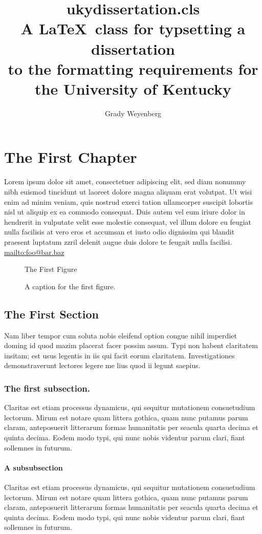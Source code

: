 \documentclass[endorse]{ukydissertation}
\title{ukydissertation.cls\protect\\%
  A \LaTeX\ class for typsetting a dissertation\protect\\%
  to the formatting requirements for\protect\\%
  the University of Kentucky%
}
\author{Grady Weyenberg}
\begin{document}
\makefrontmatter

\chapter{The First Chapter}
\label{cha:first-chapter}
Lorem ipsum dolor sit amet, consectetuer adipiscing elit, sed diam
nonummy nibh euismod tincidunt ut laoreet dolore magna aliquam erat
volutpat.\cite{lamport94} Ut wisi enim ad minim veniam, quis nostrud exerci tation
ullamcorper suscipit lobortis nisl ut aliquip ex ea commodo
consequat. Duis autem vel eum iriure dolor in hendrerit in vulputate
velit esse molestie consequat, vel illum dolore eu feugiat nulla
facilisis at vero eros et accumsan et iusto odio dignissim qui blandit
praesent luptatum zzril delenit augue duis dolore te feugait nulla
facilisi. \url{mailto:foo@bar.baz}
\begin{figure}
  \centering
  The First Figure
  \caption[A name for the ToC]{A caption for the first figure.}
  \label{fig:numberone}
\end{figure}
\section{The First Section}
\label{sec:first-section}

Nam liber tempor cum soluta nobis eleifend option congue
nihil imperdiet doming id quod mazim placerat facer possim assum. Typi
non habent claritatem insitam; est usus legentis in iis qui facit
eorum claritatem. Investigationes demonstraverunt lectores legere me
lius quod ii legunt saepius.
\subsection{The first subsection.}
\label{sec:first-subsection}

Claritas est etiam processus dynamicus,
qui sequitur mutationem consuetudium lectorum. Mirum est notare quam
littera gothica, quam nunc putamus parum claram, anteposuerit
litterarum formas humanitatis per seacula quarta decima et quinta
decima. Eodem modo typi, qui nunc nobis videntur parum clari, fiant
sollemnes in futurum.

\subsubsection{A subsubsection}

Claritas est etiam processus dynamicus,
qui sequitur mutationem consuetudium lectorum. Mirum est notare quam
littera gothica, quam nunc putamus parum claram, anteposuerit
litterarum formas humanitatis per seacula quarta decima et quinta
decima. Eodem modo typi, qui nunc nobis videntur parum clari, fiant
sollemnes in futurum.
\end{document}
